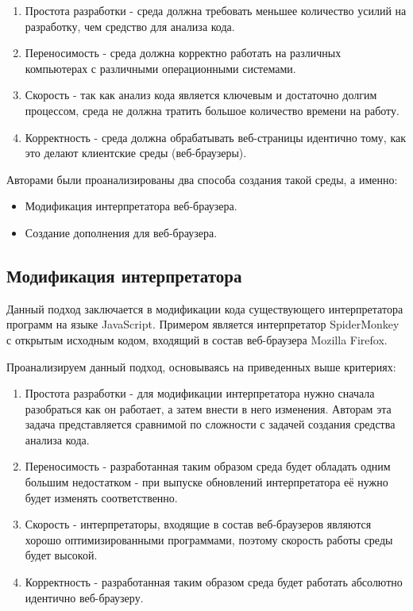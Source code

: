 	\bigskip
	\begin{enumerate}
		\item Простота разработки - среда должна требовать меньшее количество усилий на разработку, чем средство для анализа кода.
		\item Переносимость - среда должна корректно работать на различных компьютерах с различными операционными системами.
		\item Скорость - так как анализ кода является ключевым и достаточно долгим процессом, среда не должна тратить большое количество времени на работу.
		\item Корректность - среда должна обрабатывать веб-страницы идентично тому, как это делают клиентские среды (веб-браузеры).
	\end{enumerate}
	\bigskip

	Авторами были проанализированы два способа создания такой среды, а именно:
	\bigskip
	\begin{itemize}
		\item Модификация интерпретатора веб-браузера.
		\item Создание дополнения для веб-браузера.
	\end{itemize}

\subsection{Модификация интерпретатора}
	Данный подход заключается в модификации кода существующего интерпретатора программ на языке JavaScript. Примером является интерпретатор SpiderMonkey с открытым исходным кодом, входящий в состав веб-браузера Mozilla Firefox. 

	Проанализируем данный подход, основываясь на приведенных выше критериях:
	\bigskip
	\begin{enumerate}
		\item Простота разработки - для модификации интерпретатора нужно сначала разобраться как он работает, а затем внести в него изменения. Авторам эта задача представляется сравнимой по сложности с задачей создания средства анализа кода.
		\item Переносимость - разработанная таким образом среда будет обладать одним большим недостатком - при выпуске обновлений интерпретатора её нужно будет изменять соответственно.
		\item Скорость - интерпретаторы, входящие в состав веб-браузеров являются хорошо оптимизированными программами, поэтому скорость работы среды будет высокой.
		\item Корректность - разработанная таким образом среда будет работать абсолютно идентично веб-браузеру.
	\end{enumerate}
	\bigskip

